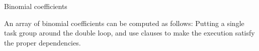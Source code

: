  {Binomial coefficients}

\begin{exercise}
  An array of binomial coefficients can be computed as follows:
  Putting a single task group around the double loop, and use
   clauses to make the execution satisfy the proper dependencies.
\end{exercise}

